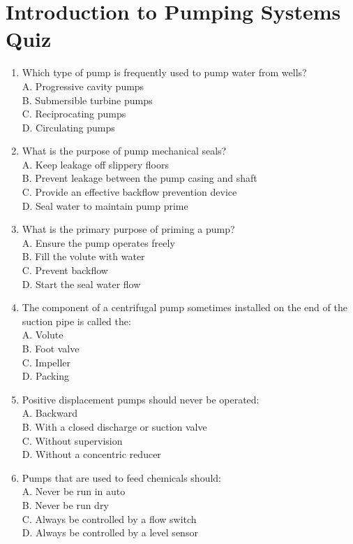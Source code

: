\documentclass[10pt]{article}
\begin{document}
\section{Introduction to Pumping Systems Quiz}
\begin{enumerate}
  \item Which type of pump is frequently used to pump water from wells?\\
A. Progressive cavity pumps\\
B. Submersible turbine pumps\\
C. Reciprocating pumps\\
D. Circulating pumps

  \item What is the purpose of pump mechanical seals?\\
A. Keep leakage off slippery floors\\
B. Prevent leakage between the pump casing and shaft\\
C. Provide an effective backflow prevention device\\
D. Seal water to maintain pump prime

  \item What is the primary purpose of priming a pump?\\
A. Ensure the pump operates freely\\
B. Fill the volute with water\\
C. Prevent backflow\\
D. Start the seal water flow

  \item The component of a centrifugal pump sometimes installed on the end of the suction pipe is called the:\\
A. Volute\\
B. Foot valve\\
C. Impeller\\
D. Packing

  \item Positive displacement pumps should never be operated:\\
A. Backward\\
B. With a closed discharge or suction valve\\
C. Without supervision\\
D. Without a concentric reducer

  \item Pumps that are used to feed chemicals should:\\
A. Never be run in auto\\
B. Never be run dry\\
C. Always be controlled by a flow switch\\
D. Always be controlled by a level sensor


\end{enumerate}
\end{document}
